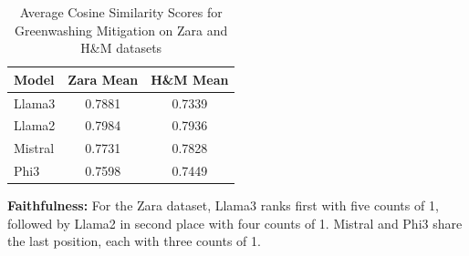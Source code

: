 \documentclass[]{article}
\begin{document}
\begin{table}[H]
    \centering
    \begin{tabular}{lcc}
        \toprule
        \textbf{Model} & \textbf{Zara Mean} & \textbf{H\&M Mean} \\
        \midrule
        Llama3  & 0.7881 & 0.7339 \\
        Llama2  & 0.7984 & 0.7936 \\
        Mistral & 0.7731 & 0.7828 \\
        Phi3    & 0.7598 & 0.7449 \\
        \bottomrule
    \end{tabular}
    \caption{Average Cosine Similarity Scores for Greenwashing Mitigation on Zara and H\&M datasets}
    \label{tab:greenwashing_mitigation}
\end{table}

\textbf{Faithfulness:}
For the Zara dataset, Llama3 ranks first with five counts of 1, followed by Llama2 in second place with four counts of 1. Mistral and Phi3 share the last position, each with three counts of 1.  
\end{document}
